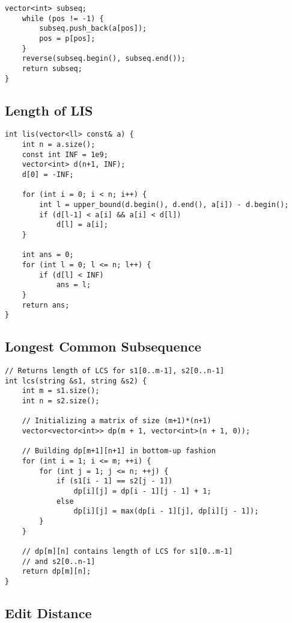 \documentclass[10pt]{article}
\begin{document}
\begin{multicols*}{2}
\begin{lstlisting}[style=compactcpp]
    vector<int> subseq;
    while (pos != -1) {
        subseq.push_back(a[pos]);
        pos = p[pos];
    }
    reverse(subseq.begin(), subseq.end());
    return subseq;
}
\end{lstlisting}

\subsection{Length of LIS}

\begin{lstlisting}[style=compactcpp]
int lis(vector<ll> const& a) {
    int n = a.size();
    const int INF = 1e9;
    vector<int> d(n+1, INF);
    d[0] = -INF;

    for (int i = 0; i < n; i++) {
        int l = upper_bound(d.begin(), d.end(), a[i]) - d.begin();
        if (d[l-1] < a[i] && a[i] < d[l])
            d[l] = a[i];
    }

    int ans = 0;
    for (int l = 0; l <= n; l++) {
        if (d[l] < INF)
            ans = l;
    }
    return ans;
}
\end{lstlisting}

\subsection{Longest Common Subsequence}

\begin{lstlisting}[style=compactcpp]
// Returns length of LCS for s1[0..m-1], s2[0..n-1]
int lcs(string &s1, string &s2) {
    int m = s1.size();
    int n = s2.size();

    // Initializing a matrix of size (m+1)*(n+1)
    vector<vector<int>> dp(m + 1, vector<int>(n + 1, 0));

    // Building dp[m+1][n+1] in bottom-up fashion
    for (int i = 1; i <= m; ++i) {
        for (int j = 1; j <= n; ++j) {
            if (s1[i - 1] == s2[j - 1])
                dp[i][j] = dp[i - 1][j - 1] + 1;
            else
                dp[i][j] = max(dp[i - 1][j], dp[i][j - 1]);
        }
    }

    // dp[m][n] contains length of LCS for s1[0..m-1]
    // and s2[0..n-1]
    return dp[m][n];
}

\end{lstlisting}

\subsection{Edit Distance}


\end{multicols*}
\end{document}
